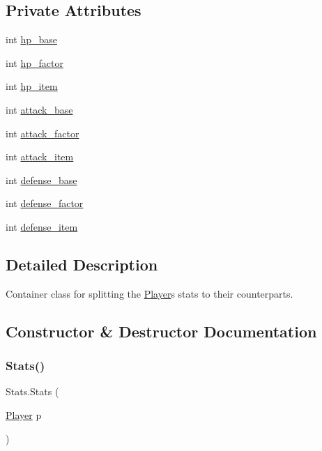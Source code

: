 \subsection*{Private Attributes}
\begin{DoxyCompactItemize}
\item 
int \mbox{\hyperlink{class_stats_af27886653d8837bec212a561af283ac3}{hp\+\_\+base}}
\item 
int \mbox{\hyperlink{class_stats_a4fcf9b4ac608c22beb0d0967e281a9fb}{hp\+\_\+factor}}
\item 
int \mbox{\hyperlink{class_stats_ab942a61fab50a4e0f4a9e5a26a0a8292}{hp\+\_\+item}}
\item 
int \mbox{\hyperlink{class_stats_ad9eb2f88006a8a248d90ca9fe68bd492}{attack\+\_\+base}}
\item 
int \mbox{\hyperlink{class_stats_ae650131fb2e278f48782e23b0a60038d}{attack\+\_\+factor}}
\item 
int \mbox{\hyperlink{class_stats_af8162ae5212a60c1e7be5caad0a85ec8}{attack\+\_\+item}}
\item 
int \mbox{\hyperlink{class_stats_a4f2332d664ab1f99a0ea467fab258d15}{defense\+\_\+base}}
\item 
int \mbox{\hyperlink{class_stats_a5856d042de152aabb7cae493fbbfce3d}{defense\+\_\+factor}}
\item 
int \mbox{\hyperlink{class_stats_a5e70e6d559c64b1bdc743841a87fe821}{defense\+\_\+item}}
\end{DoxyCompactItemize}


\subsection{Detailed Description}
Container class for splitting the \mbox{\hyperlink{class_player}{Player}}\textquotesingle{}s stats to their counterparts. 

\subsection{Constructor \& Destructor Documentation}
\mbox{\label{class_stats_af8606e198097e115c6ee9e1de60af34c}} 
\subsubsection{\texorpdfstring{Stats()}{Stats()}}
{\footnotesize\ttfamily Stats.\+Stats (\begin{DoxyParamCaption}\item[{\mbox{\hyperlink{class_player}{Player}}}]{p }\end{DoxyParamCaption})\hspace{0.3cm}{\ttfamily [inline]}}



